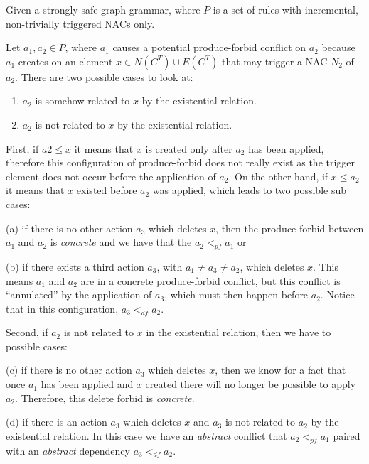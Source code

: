 \begin{definition} Given \doublyTypedGraphGrammarCore{} a strongly safe graph grammar, where $P$ is a set of rules with incremental, non-trivially triggered NACs only.

\hfill

  Let $a_1,a_2 \in P$, where $a_1$ causes a potential produce-forbid conflict on $a_2$ because $a_1$ creates on an element $x \in N(C^T) \cup E(C^T)$ that may trigger a NAC $N_2$ of $a_2$. There are two possible cases to look at:

  \begin{enumerate}
    \item $a_2$ is somehow related to $x$ by the existential relation.
    \item $a_2$ is not related to $x$ by the existential relation.
  \end{enumerate}

  First, if $a2 \leq x$ it means that $x$ is created only after $a_2$ has been applied, therefore this configuration of produce-forbid does not really exist as the trigger element does not occur before the application of $a_2$. On the other hand, if $x \leq a_2$ it means that $x$ existed before $a_2$ was applied, which leads to two possible sub cases: 
  
  (a) if there is no other action $a_3$ which deletes $x$, then the produce-forbid between $a_1$ and $a_2$ is \emph{concrete} and we have
  that the $a_2 <_{pf} a_1$ or 
  
  (b) if there exists a third action $a_3$, with $a_1 \ne a_3 \ne a_2$, which deletes $x$. This means $a_1$ and $a_2$ are in a concrete produce-forbid conflict, but this conflict is ``annulated'' by the application of $a_3$, which must then happen before $a_2$. Notice that in this configuration, $a_3 <_{df} a_2$.

  Second, if $a_2$ is not related to $x$ in the existential relation, then we have to possible cases:

  (c) if there is no other action $a_3$ which deletes $x$, then we know for a fact that once $a_1$ has been applied and $x$ created there will no longer be possible to apply $a_2$. Therefore, this delete forbid is \emph{concrete}.

  (d) if there is an action $a_3$ which deletes $x$ and $a_3$ is not related to $a_2$ by the existential relation. In this case we have an \emph{abstract} conflict that $a_2 <_{pf} a_1$ paired with an \emph{abstract} dependency $a_3 <_{df} a_2$.
\end{definition}

